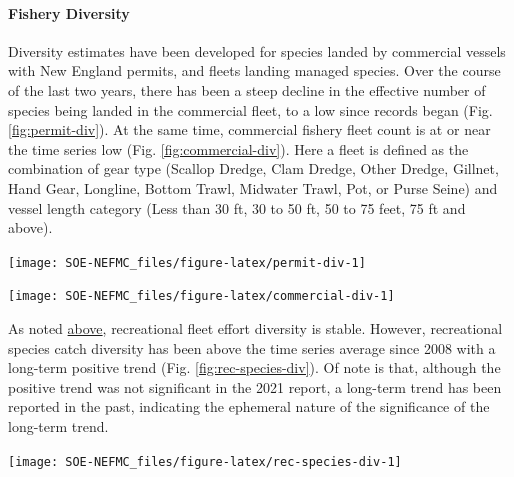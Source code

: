 \documentclass[
  10pt,
]{article}
\let\origfigure\figure
\let\endorigfigure\endfigure
\renewenvironment{figure}[1][2] {
    \expandafter\origfigure\expandafter[H]
} {
    \endorigfigure
}
\begin{document}
\hypertarget{fishery-diversity}{%
\paragraph{Fishery Diversity}\label{fishery-diversity}}

Diversity estimates have been developed for species landed by commercial vessels with New England permits, and fleets landing managed species. Over the course of the last two years, there has been a steep decline in the effective number of species being landed in the commercial fleet, to a low since records began (Fig. \ref{fig:permit-div}). At the same time, commercial fishery fleet count is at or near the time series low (Fig. \ref{fig:commercial-div}). Here a fleet is defined as the combination of gear type (Scallop Dredge, Clam Dredge, Other Dredge, Gillnet, Hand Gear, Longline, Bottom Trawl, Midwater Trawl, Pot, or Purse Seine) and vessel length category (Less than 30 ft, 30 to 50 ft, 50 to 75 feet, 75 ft and above).

\begin{figure}

{\centering \texttt{[image: SOE-NEFMC\_files/figure-latex/permit-div-1]} 

}

\caption{Species revenue diversity in New England.}\label{fig:permit-div}
\end{figure}

\begin{figure}

{\centering \texttt{[image: SOE-NEFMC\_files/figure-latex/commercial-div-1]} 

}

\caption{Commercial fleet count and diversity in New England.}\label{fig:commercial-div}
\end{figure}

As noted \protect\hyperlink{recreational-opportunities}{above}, recreational fleet effort diversity is stable. However, recreational species catch diversity has been above the time series average since 2008 with a long-term positive trend (Fig. \ref{fig:rec-species-div}). Of note is that, although the positive trend was not significant in the 2021 report, a long-term trend has been reported in the past, indicating the ephemeral nature of the significance of the long-term trend.

\begin{figure}

{\centering \texttt{[image: SOE-NEFMC\_files/figure-latex/rec-species-div-1]} 

}

\caption{Diversity of recreational catch in New England.}\label{fig:rec-species-div}
\end{figure}
\end{document}
